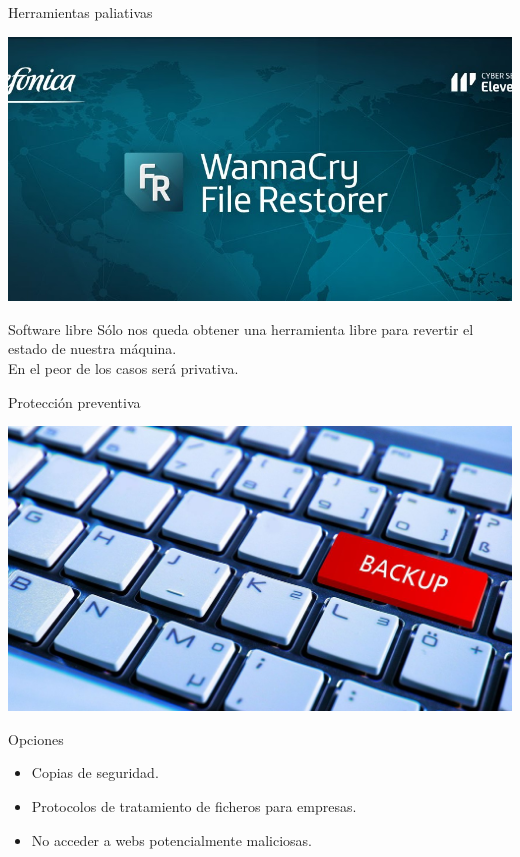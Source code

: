 \documentclass[10pt]{beamer}
\begin{document}
\begin{frame}[fragile]{Herramientas paliativas}
	\begin{center}
		\includegraphics[scale=0.3]{./Imagenes/ransomware7.jpg}
	\end{center}
	\pause
	\begin{block}{Software libre}
		Sólo nos queda obtener una herramienta libre para revertir el estado de nuestra máquina. \\
		En el peor de los casos será privativa.
	\end{block}
\end{frame}

\begin{frame}[fragile]{Protección preventiva}
	\begin{center}
		\includegraphics[scale=0.18]{./Imagenes/ransomware8.jpg}
	\end{center}
	\pause
	\begin{exampleblock}{Opciones}
		\begin{itemize}
			\item Copias de seguridad.
			\pause
			\item Protocolos de tratamiento de ficheros para empresas.
			\pause
			\item No acceder a webs potencialmente maliciosas.
		\end{itemize}
	\end{exampleblock}
\end{frame}
\end{document}
